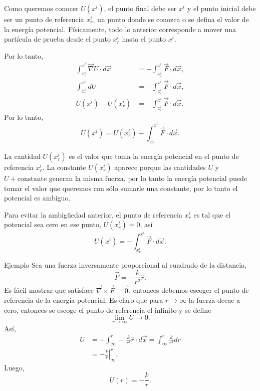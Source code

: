 \documentclass[../apunte_mecanica_clasica.tex]{subfiles}%
\begin{document}
Como queremos conocer $U(x^i)$, el punto final debe ser $x^i$ y el punto inicial debe ser un punto de referencia $x^i_r$, un punto donde se conozca o se defina el valor de la energía potencial. Físicamente, todo lo anterior corresponde a mover una partícula de prueba desde el punto $x^i_r$ hasta el punto $x^i$.

Por lo tanto,
\begin{align*}
    \int_{x^i_r}^{x^i}\vec\nabla U\cdot d\vec x
    &=-\int_{x^i_r}^{x^i}\vec F\cdot d\vec x,\\
    \int_{x^i_r}^{x^i}dU
    &=-\int_{x^i_r}^{x^i}\vec F\cdot d\vec x,\\
    U(x^i)-U(x^i_r)
    &=-\int_{x^i_r}^{x^i}\vec F\cdot d\vec x.
\end{align*}
Por lo tanto,
\begin{equation*}
    U(x^i)=U(x^i_r)-\int_{x^i_r}^{x^i}\vec F\cdot d\vec x.
\end{equation*}

La cantidad $U(x^i_r)$ es el valor que toma la energía potencial en el punto de referencia $x^i_r$. La constante $U(x^i_r)$ aparece porque las cantidades $U$ y $U+\text{constante}$ generan la misma fuerza, por lo tanto la energía potencial puede tomar el valor que queremos con sólo sumarle una constante, por lo tanto el potencial es ambiguo.

Para evitar la ambigüedad anterior, el punto de referencia $x^i_r$ es tal que el potencial sea cero en ese punto, $U(x^i_r)=0$, así
\begin{equation*}
    U(x^i)=-\int_{x^i_r}^{x^i}\vec F\cdot d\vec x.
\end{equation*}

\begin{apuntebloque}{Ejemplo}
Sea una fuerza inversamente proporcional al cuadrado de la distancia,
\begin{equation*}
    \vec F=-\frac{k}{r^2}\hat r.
\end{equation*}
Es fácil mostrar que satisface $\vec\nabla\times\vec F=\vec 0$, entonces debemos escoger el punto de referencia de la energía potencial. Es claro que para $r\to\infty$ la fuerza decae a cero, entonces se escoge el punto de referencia el infinito y se define
\begin{equation*}
    \lim_{r\to\infty}U\to 0.
\end{equation*}
Así,
\begin{align*}
    U
    &=-\int_{\infty}^{r}-\frac{k}{r^2}\hat r\cdot d\vec x
      =\int_{\infty}^{r}\frac{k}{r^2}dr \\
    &=\left.-\frac{k}{r}\right|_{\infty}^{r}.
\end{align*}
Luego,
\begin{equation*}
    U(r)=-\frac{k}{r}.
\end{equation*}
\end{apuntebloque}
\end{document}
